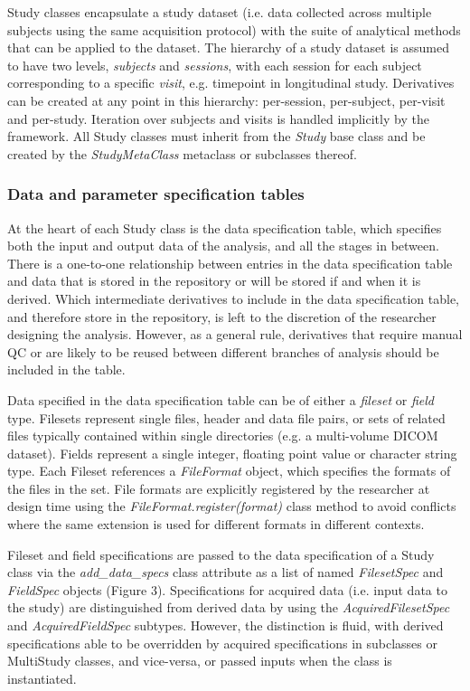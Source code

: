 Study classes encapsulate a study dataset (i.e. data collected across
multiple subjects using the same acquisition protocol) with the suite of
analytical methods that can be applied to the dataset. The hierarchy of
a study dataset is assumed to have two levels, \emph{subjects} and
\emph{sessions}, with each session for each subject corresponding to a
specific \emph{visit}, e.g. timepoint in longitudinal study. Derivatives
can be created at any point in this hierarchy: per-session, per-subject,
per-visit and per-study. Iteration over subjects and visits is handled
implicitly by the framework. All Study classes must inherit from the
\emph{Study} base class and be created by the \emph{StudyMetaClass}
metaclass or subclasses thereof.

\subsubsection{Data and parameter specification
tables}
\label{data-and-parameter-specification-tables}

At the heart of each Study class is the data specification table, which
specifies both the input and output data of the analysis, and all the
stages in between. There is a one-to-one relationship between entries in
the data specification table and data that is stored in the repository
or will be stored if and when it is derived. Which intermediate
derivatives to include in the data specification table, and therefore
store in the repository, is left to the discretion of the researcher
designing the analysis. However, as a general rule, derivatives that
require manual QC or are likely to be reused between different branches
of analysis should be included in the table.

Data specified in the data specification table can be of either a
\emph{fileset} or \emph{field} type. Filesets represent single files,
header and data file pairs, or sets of related files typically contained
within single directories (e.g. a multi-volume DICOM dataset). Fields
represent a single integer, floating point value or character string
type. Each Fileset references a \emph{FileFormat} object, which
specifies the formats of the files in the set. File formats are
explicitly registered by the researcher at design time using the
\emph{FileFormat.register(format)} class method to avoid conflicts where
the same extension is used for different formats in different contexts.

Fileset and field specifications are passed to the data specification of
a Study class via the \emph{add\_data\_specs} class attribute as a list
of named \emph{FilesetSpec} and \emph{FieldSpec} objects (Figure 3).
Specifications for acquired data (i.e. input data to the study) are
distinguished from derived data by using the \emph{AcquiredFilesetSpec}
and \emph{AcquiredFieldSpec} subtypes. However, the distinction is
fluid, with derived specifications able to be overridden by acquired
specifications in subclasses or MultiStudy classes, and vice-versa, or
passed inputs when the class is instantiated.


